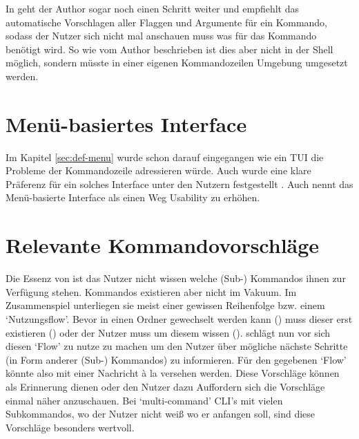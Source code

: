 \documentclass[oneside,bibliography=totocnumbered,BCOR=5mm]{scrbook}
\begin{document}

In \textcite{dutta} geht der Author sogar noch einen Schritt weiter und empfiehlt
das automatische Vorschlagen aller Flaggen und Argumente für ein Kommando,
sodass der Nutzer sich nicht mal anschauen muss was für das Kommando benötigt
wird. So wie vom Author beschrieben ist dies aber nicht in der Shell möglich,
sondern müsste in einer eigenen Kommandozeilen Umgebung umgesetzt werden.

\section{Menü-basiertes Interface}

Im Kapitel \ref{sec:def-menu} wurde schon darauf eingegangen wie ein
TUI die Probleme der Kommandozeile adressieren würde. Auch wurde eine
klare Präferenz für ein solches Interface unter den Nutzern festgestellt
\parencite{Westerman_1997}. Auch \textcite{Spolsky_2001} nennt das Menü-basierte
Interface als einen Weg Usability zu erhöhen.


\section{Relevante Kommandovorschläge}

Die Essenz von  ist das Nutzer nicht wissen welche (Sub-) Kommandos
ihnen zur Verfügung stehen. Kommandos existieren aber nicht im Vakuum. Im
Zusammenspiel unterliegen sie meist einer gewissen Reihenfolge bzw. einem
`Nutzungsflow'. Bevor in einen Ordner gewechselt werden kann ()
muss dieser erst existieren () oder der Nutzer muss um diesem
wissen (). \textcite{dutta} schlägt nun vor sich diesen `Flow'
zu nutze zu machen um den Nutzer über mögliche nächste Schritte (in Form
anderer (Sub-) Kommandos) zu informieren. Für den gegebenen `Flow' könnte
also  mit einer Nachricht à la  versehen werden. Diese Vorschläge können als Erinnerung dienen oder
den Nutzer dazu Auffordern sich die Vorschläge einmal näher anzuschauen. Bei
`multi-command' CLI's mit vielen Subkommandos, wo der Nutzer nicht weiß wo er
anfangen soll, sind diese Vorschläge besonders wertvoll.

\end{document}
